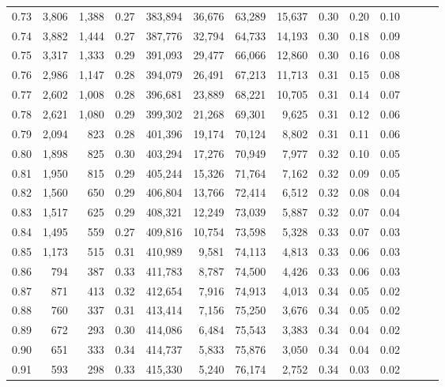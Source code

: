 \begin{tabular}{rrrrrrrrrrrrrr}
0.73 &  3,806 &  1,388 &  0.27 &  383,894 &   36,676 &  63,289 &  15,637 &  0.30 &  0.20 &      0.10 \\
0.74 &  3,882 &  1,444 &  0.27 &  387,776 &   32,794 &  64,733 &  14,193 &  0.30 &  0.18 &      0.09 \\
0.75 &  3,317 &  1,333 &  0.29 &  391,093 &   29,477 &  66,066 &  12,860 &  0.30 &  0.16 &      0.08 \\
0.76 &  2,986 &  1,147 &  0.28 &  394,079 &   26,491 &  67,213 &  11,713 &  0.31 &  0.15 &      0.08 \\
0.77 &  2,602 &  1,008 &  0.28 &  396,681 &   23,889 &  68,221 &  10,705 &  0.31 &  0.14 &      0.07 \\
0.78 &  2,621 &  1,080 &  0.29 &  399,302 &   21,268 &  69,301 &   9,625 &  0.31 &  0.12 &      0.06 \\
0.79 &  2,094 &    823 &  0.28 &  401,396 &   19,174 &  70,124 &   8,802 &  0.31 &  0.11 &      0.06 \\
0.80 &  1,898 &    825 &  0.30 &  403,294 &   17,276 &  70,949 &   7,977 &  0.32 &  0.10 &      0.05 \\
0.81 &  1,950 &    815 &  0.29 &  405,244 &   15,326 &  71,764 &   7,162 &  0.32 &  0.09 &      0.05 \\
0.82 &  1,560 &    650 &  0.29 &  406,804 &   13,766 &  72,414 &   6,512 &  0.32 &  0.08 &      0.04 \\
0.83 &  1,517 &    625 &  0.29 &  408,321 &   12,249 &  73,039 &   5,887 &  0.32 &  0.07 &      0.04 \\
0.84 &  1,495 &    559 &  0.27 &  409,816 &   10,754 &  73,598 &   5,328 &  0.33 &  0.07 &      0.03 \\
0.85 &  1,173 &    515 &  0.31 &  410,989 &    9,581 &  74,113 &   4,813 &  0.33 &  0.06 &      0.03 \\
0.86 &    794 &    387 &  0.33 &  411,783 &    8,787 &  74,500 &   4,426 &  0.33 &  0.06 &      0.03 \\
0.87 &    871 &    413 &  0.32 &  412,654 &    7,916 &  74,913 &   4,013 &  0.34 &  0.05 &      0.02 \\
0.88 &    760 &    337 &  0.31 &  413,414 &    7,156 &  75,250 &   3,676 &  0.34 &  0.05 &      0.02 \\
0.89 &    672 &    293 &  0.30 &  414,086 &    6,484 &  75,543 &   3,383 &  0.34 &  0.04 &      0.02 \\
0.90 &    651 &    333 &  0.34 &  414,737 &    5,833 &  75,876 &   3,050 &  0.34 &  0.04 &      0.02 \\
0.91 &    593 &    298 &  0.33 &  415,330 &    5,240 &  76,174 &   2,752 &  0.34 &  0.03 &      0.02 \\

\end{tabular}
